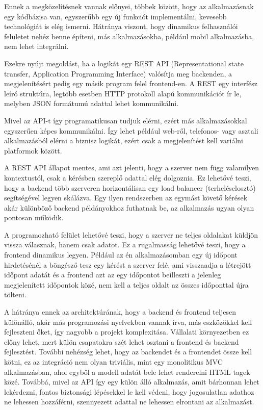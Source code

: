 Ennek a megközelítésnek vannak előnyei, többek között, hogy az alkalmazásnak egy kódbázisa van, egyszerűbb egy új funkciót implementálni, kevesebb technológiát is elég ismerni. Hátránya viszont, hogy dinamikus felhasználói felületet nehéz benne építeni, más alkalmazásokba, például mobil alkalmazásba, nem lehet integrálni.

Ezekre nyújt megoldást, ha a logikát egy REST API (Representational state transfer, Application Programming Interface) valósítja meg backenden, a megjelenítésért pedig egy másik program felel frontend-en. A REST egy interfész leíró struktúra, legtöbb esetben HTTP protokoll alapú kommunikációt ír le, melyben JSON formátumú adattal lehet kommunikálni.

Mivel az API-t így programatikusan tudjuk elérni, ezért más alkalmazásokkal egyszerűen képes kommunikálni. Így lehet például web-ről, telefonos- vagy asztali alkalmazásból elérni a biznisz logikát, ezért csak a megjelenítést kell variálni platformok között.

A REST API állapot mentes, ami azt jelenti, hogy a szerver nem függ valamilyen kontextustól, csak a kérésben szereplő adattal elég dolgoznia. Ez lehetővé teszi, hogy a backend több szerveren horizontálisan egy load balancer (terheléselosztó) segítségével legyen skálázva. Egy ilyen rendszerben az egymást követő kérések akár különböző backend példányokhoz futhatnak be, az alkalmazás ugyan olyan pontosan működik.

A programozható felület lehetővé teszi, hogy a szerver ne teljes oldalakat küldjön vissza válasznak, hanem csak adatot. Ez a rugalmasság lehetővé teszi, hogy a frontend dinamikus legyen. Például az én alkalmazásomban egy új időpont hirdetésénél a böngésző tesz egy kérést a szerver felé, ami visszaadja a létrejött időpont adatát és a frontend azt az egy időpontot beilleszti a jelenleg megjelenített időpontok közé, nem kell a teljes oldalt az összes időponttal újra tölteni.

A hátránya ennek az architektúrának, hogy a backend és frontend teljesen különálló, akár más programozási nyelvekben vannak írva, más eszközökkel kell fejleszteni őket, így nagyobb a projekt komplexitása. Vállalati környezetben ez előny lehet, mert külön csapatokra szét lehet osztani a frontend és backend fejlesztést. További nehézség lehet, hogy az backendet és a frontendet össze kell kötni, ez az integráció nem olyan triviális, mint egy monolitikus MVC alkalmazásban, ahol egyből a modell adatát bele lehet renderelni HTML tagek közé. Továbbá, mivel az API így egy külön álló alkalmazás, amit bárhonnan lehet lekérdezni, fontos biztonsági lépésekkel le kell védeni, hogy jogosulatlan adathoz ne lehessen hozzáférni, szennyezett adattal ne lehessen elrontani az alkalmazást.

